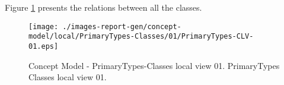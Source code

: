 Figure \ref{fig:lu.uni.lassy.excalibur.MyCrash.G02-CM-view-local-PrimaryTypes-Classes-01} presents the relations between all the classes.



\begin{figure}[htbp] 
\label{fig:lu.uni.lassy.excalibur.MyCrash.G02-CM}
\begin{center}
\texttt{[image: ./images-report-gen/concept-model/local/PrimaryTypes-Classes/01/PrimaryTypes-CLV-01.eps]}
\end{center}
\caption[Concept Model - PrimaryTypes-Classes local view 01 - PrimaryTypes Classes local view 01]{Concept Model - PrimaryTypes-Classes local view 01. PrimaryTypes Classes local view 01.}
\label{fig:lu.uni.lassy.excalibur.MyCrash.G02-CM-view-local-PrimaryTypes-Classes-01}
\end{figure}
\vspace{0.5cm} 
